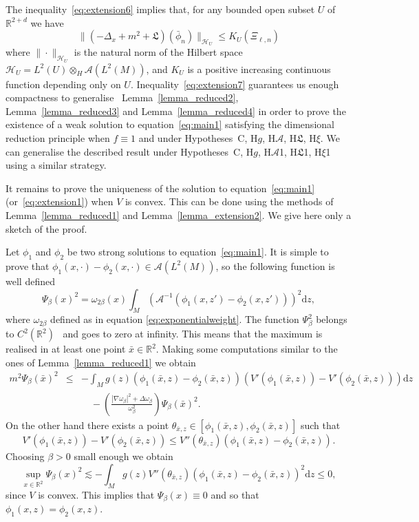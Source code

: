 \documentclass[a4paper,10pt]{article}
\newcommand{\mathd}{\mathrm{d}}
\begin{document}
The inequality~{\eqref{eq:extension6}} implies that, for any bounded open
subset $U$ of $\mathbb{R}^{2 + d}$ we have
\begin{equation}
  \| (- \Delta_x + m^2 + \mathfrak{L}) (\bar{\phi}_n) \|_{\mathcal{H}_U}
  \leqslant K_U (\Xi_{\ell, n}) \label{eq:extension7}
\end{equation}
where $\| \cdot \|_{\mathcal{H}_U}$ is the natural norm of the Hilbert space
$\mathcal{H}_U = L^2 (U) \otimes_H \mathcal{A} (L^2 (M))$, and $K_U$ is a
positive increasing continuous function depending only on $U$.
Inequality~{\eqref{eq:extension7}} guarantees us enough compactness to
generalise \ Lemma~\ref{lemma_reduced2}, Lemma~\ref{lemma_reduced3} and
Lemma~\ref{lemma_reduced4} in order to prove the existence of a weak solution
to equation~{\eqref{eq:main1}} satisfying the dimensional reduction principle
when $f \equiv 1$ and under Hypotheses~C, H$g$, H$\mathcal{A}$,
H$\mathfrak{L}$, H$\xi$. We can generalise the described result under
Hypotheses~C, H$g$, H$\mathcal{A}$1, H$\mathfrak{L}$1, H$\xi$1 using a similar
strategy.

It remains to prove the uniqueness of the solution to
equation~{\eqref{eq:main1}} (or~{\eqref{eq:extension1}}) when $V$ is convex.
This can be done using the methods of Lemma~\ref{lemma_reduced1} and
Lemma~\ref{lemma_extension2}. We give here only a sketch of the proof.

Let $\phi_1$ and $\phi_2$ be two strong solutions to
equation~{\eqref{eq:main1}}. It is simple to prove that $\phi_1 (x, \cdot) -
\phi_2 (x, \cdot) \in \mathcal{A} (L^2 (M))$, so the following function is
well defined
\[ \Psi_{\beta} (x)^2 = \omega_{2 \beta} (x) \int_M (\mathcal{A}^{- 1} (\phi_1
   (x, z') - \phi_2 (x, z')))^2 \mathd z, \]
where $\omega_{2 \beta}$ defined as in equation
{\eqref{eq:exponentialweight}}. The function $\Psi^2_{\beta}$ belongs to $C^2
(\mathbb{R}^2)$ \ and goes to zero at infinity. This means that the maximum is
realised in at least one point $\bar{x} \in \mathbb{R}^2 .$ Making some
computations similar to the ones of Lemma~\ref{lemma_reduced1} we obtain
\[ \begin{array}{lll}
     m^2 \Psi_{\beta} (\bar{x})^2 & \leqslant & - \int_M g (z) (\phi_1
     (\bar{x}, z) - \phi_2 (\bar{x}, z))_{} (V' (\phi_1 (\bar{x}, z)) - V'
     (\phi_2 (\bar{x}, z))) \mathd z\\
     &  & \quad - \left( \frac{| \nabla \omega_{\beta} |^2 + \Delta
     \omega_{\beta}}{\omega_{\beta}^2} \right) \Psi_{\beta} (\bar{x})^2 .
   \end{array} \]
On the other hand there exists a point $\theta_{\bar{x}, z} \in [\phi_1
(\bar{x}, z), \phi_2 (\bar{x}, z)]$ such that
\[ V' (\phi_1 (\bar{x}, z)) - V' (\phi_2 (\bar{x}, z)) \leqslant V''
   (\theta_{\bar{x}, z}) (\phi_1 (\bar{x}, z) - \phi_2 (\bar{x}, z))_{} . \]
Choosing $\beta > 0$ small enough we obtain
\[ \sup_{x \in \mathbb{R}^2} \Psi_{\beta} (x)^2 \lesssim - \int_M g (z) V''
   (\theta_{\bar{x}, z}) (\phi_1 (\bar{x}, z) - \phi_2 (\bar{x}, z))^2_{}
   \mathd z \leqslant 0, \]
since $V$ is convex. This implies that $\Psi_{\beta} (x) \equiv 0$ and so that
$\phi_1 (x, z) = \phi_2 (x, z)$.
\end{document}
